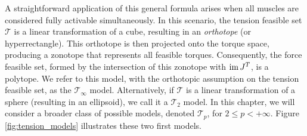 A straightforward application of this general formula arises when all muscles are considered fully activable simultaneously. In this scenario, the tension feasible set $\mathcal{T}$ is a linear transformation of a cube, resulting in an \emph{orthotope} (or hyperrectangle). This orthotope is then projected onto the torque space, producing a zonotope that represents all feasible torques. Consequently, the force feasible set, formed by the intersection of this zonotope with $\operatorname{im} J^T$, is a polytope.  We refer to this model, with the orthotopic assumption on the tension feasible set, as the $\mathcal{T}_{\infty}$ model.  Alternatively, if $\mathcal{T}$ is a linear transformation of a sphere (resulting in an ellipsoid), we call it a $\mathcal{T}_2$ model. In this chapter, we will consider a broader class of possible models, denoted $\mathcal{T}_p$, for $2 \leq p < +\infty$. Figure \ref{fig:tension_models} illustrates these two first models.

